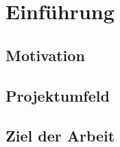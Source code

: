\chapter{Einführung}
\label{cha:Einleitung}


\section{Motivation}
\label{sec:Motivation}

\section{Projektumfeld}
\label{sec:Projektumfeld}

\section{Ziel der Arbeit}
\label{sec:ZielDerArbeit}
